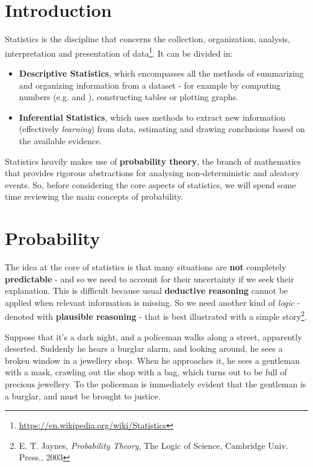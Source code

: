 \documentclass[../template.tex]{subfiles}
\begin{document}
\section{Introduction}
Statistics is the discipline that concerns the collection, organization, analysis, interpretation and presentation of data\footnote{\url{https://en.wikipedia.org/wiki/Statistics}}. It can be divided in:
\begin{itemize}
    \item \textbf{Descriptive Statistics}, which encompasses all the methods of summarizing and organizing information from a dataset - for example by computing numbers (e.g.  and ), constructing tables or plotting graphs.
    \item \textbf{Inferential Statistics}, which uses methods to extract new information (effectively \textit{learning}) from data, estimating and drawing conclusions based on the available evidence.
\end{itemize}
Statistics heavily makes use of \textbf{probability theory}, the branch of mathematics that provides rigorous abstractions for analysing non-deterministic and aleatory events. So, before considering the core aspects of statistics, we will spend some time reviewing the main concepts of probability.


\section{Probability}
The idea at the core of statistics is that many situations are \textbf{not} completely \textbf{predictable} - and so we need to account for their uncertainty if we seek their explanation. This is difficult because usual \textbf{deductive reasoning} cannot be applied when relevant information is missing. So we need another kind of \textit{logic} - denoted with \textbf{plausible reasoning} - that is best illustrated with a simple story\footnote{E. T. Jaynes, \textit{Probability Theory}, The Logic of Science, Cambridge Univ. Press., 2003}.

\medskip

Suppose that it's a dark night, and a policeman walks along a street, apparently deserted. Suddenly he hears a burglar alarm, and looking around, he sees a broken window in a jewellery shop. When he approaches it, he sees a gentleman with a mask, crawling out the shop with a bag, which turns out to be full of precious jewellery. To the policeman is immediately evident that the gentleman is a burglar, and must be brought to justice.
\end{document}
